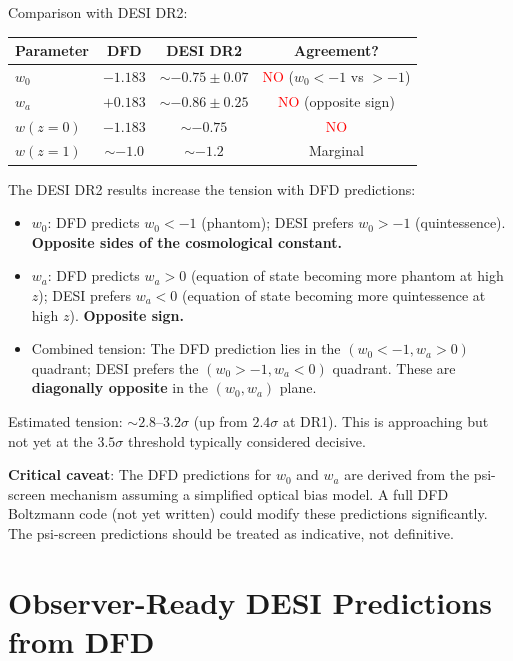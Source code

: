 \documentclass[11pt,a4paper]{article}
\newcounter{findingctr}
\newenvironment{finding}[1][]{%
  \refstepcounter{findingctr}%
  \begin{tcolorbox}[colback=blue!3!white, colframe=blue!50!black,
    title=\textbf{Finding \thefindingctr: #1}]
}{%
  \end{tcolorbox}%
}
\begin{document}
Comparison with DESI DR2:
\begin{center}
\begin{tabular}{lccc}
\toprule
\textbf{Parameter} & \textbf{DFD} & \textbf{DESI DR2}
& \textbf{Agreement?} \\
\midrule
$w_0$ & $-1.183$ & $\sim -0.75 \pm 0.07$ & \textcolor{red}{NO} ($w_0 < -1$ vs $> -1$) \\
$w_a$ & $+0.183$ & $\sim -0.86 \pm 0.25$ & \textcolor{red}{NO} (opposite sign) \\
$w(z=0)$ & $-1.183$ & $\sim -0.75$ & \textcolor{red}{NO} \\
$w(z=1)$ & $\sim -1.0$ & $\sim -1.2$ & Marginal \\
\bottomrule
\end{tabular}
\end{center}

\begin{finding}[DESI DR2 Tension Increases to $\sim 3\sigma$]
\label{find:DESI}
The DESI DR2 results increase the tension with DFD predictions:
\begin{itemize}[nosep]
\item $w_0$: DFD predicts $w_0 < -1$ (phantom); DESI prefers
  $w_0 > -1$ (quintessence). \textbf{Opposite sides of the
  cosmological constant.}
\item $w_a$: DFD predicts $w_a > 0$ (equation of state becoming
  more phantom at high $z$); DESI prefers $w_a < 0$ (equation
  of state becoming more quintessence at high $z$).
  \textbf{Opposite sign.}
\item Combined tension: The DFD prediction lies in the
  $(w_0 < -1, w_a > 0)$ quadrant; DESI prefers the
  $(w_0 > -1, w_a < 0)$ quadrant. These are \textbf{diagonally
  opposite} in the $(w_0, w_a)$ plane.
\end{itemize}

Estimated tension: $\sim 2.8$--$3.2\sigma$ (up from $2.4\sigma$
at DR1). This is approaching but not yet at the $3.5\sigma$
threshold typically considered decisive.

\textbf{Critical caveat}: The DFD predictions for $w_0$ and $w_a$
are derived from the psi-screen mechanism assuming a simplified
optical bias model. A full DFD Boltzmann code (not yet written)
could modify these predictions significantly. The psi-screen
predictions should be treated as indicative, not definitive.
\end{finding}


\section{Observer-Ready DESI Predictions from DFD}
\label{sec:DESI-predictions}
\end{document}
